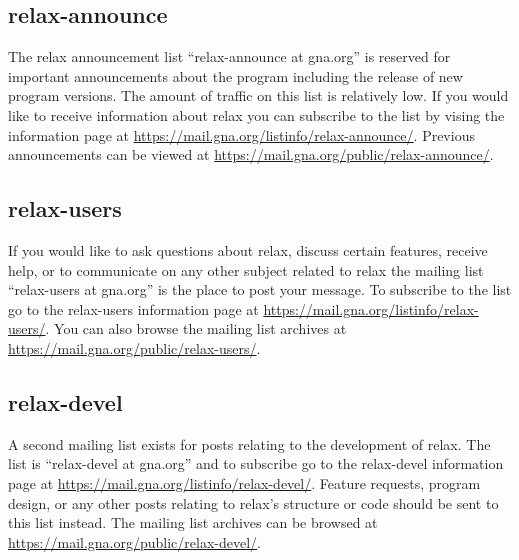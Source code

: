 \subsection{relax-announce}

The relax announcement list ``relax-announce at gna.org'' is reserved for important announcements about the program including the release of new program versions.  The amount of traffic on this list is relatively low.  If you would like to receive information about relax you can subscribe to the list by vising the information page at \href{https://mail.gna.org/listinfo/relax-announce/}{https://mail.gna.org/listinfo/relax-announce/}.  Previous announcements can be viewed at \href{https://mail.gna.org/public/relax-announce/}{https://mail.gna.org/public/relax-announce/}.


\subsection{relax-users}

If you would like to ask questions about relax, discuss certain features, receive help, or to communicate on any other subject related to relax the mailing list ``relax-users at gna.org'' is the place to post your message.  To subscribe to the list go to the relax-users information page at \href{https://mail.gna.org/listinfo/relax-users/}{https://mail.gna.org/listinfo/relax-users/}.  You can also browse the mailing list archives at \href{https://mail.gna.org/public/relax-users/}{https://mail.gna.org/public/relax-users/}.


\subsection{relax-devel} \label{sect: relax-devel mailing list}

A second mailing list exists for posts relating to the development of relax.  The list is ``relax-devel at gna.org'' and to subscribe go to the relax-devel information page at \href{https://mail.gna.org/listinfo/relax-devel/}{https://mail.gna.org/listinfo/relax-devel/}.  Feature requests, program design, or any other posts relating to relax's structure or code should be sent to this list instead.  The mailing list archives can be browsed at \href{https://mail.gna.org/public/relax-devel/}{https://mail.gna.org/public/relax-devel/}.



